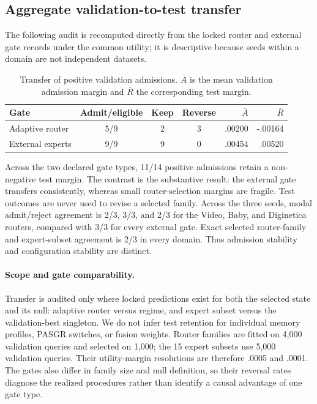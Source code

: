 \documentclass[runningheads]{llncs}
\begin{document}
\subsection{Aggregate validation-to-test transfer}
The following audit is recomputed directly from the locked router and external
gate records under the common utility; it is descriptive because seeds within
a domain are not independent datasets.
\begin{table}[H]
\caption{Transfer of positive validation admissions. $\bar A$ is the mean
validation admission margin and $\bar R$ the corresponding test margin.}
\centering\small
\begin{tabular}{lcccrr}
\toprule
Gate & Admit/eligible & Keep & Reverse & $\bar A$ & $\bar R$\\
\midrule
Adaptive router & 5/9 & 2 & 3 & .00200 & -.00164\\
External experts & 9/9 & 9 & 0 & .00454 & .00520\\
\bottomrule
\end{tabular}
\end{table}
Across the two declared gate types, 11/14 positive admissions retain a
non-negative test margin. The contrast is the substantive result: the
external gate transfers consistently, whereas small router-selection margins
are fragile. Test outcomes are never used to revise a selected family.
Across the three seeds, modal admit/reject agreement is 2/3, 3/3, and 2/3 for
the Video, Baby, and Diginetica routers, compared with 3/3 for every external
gate. Exact selected router-family and expert-subset agreement is 2/3 in every
domain. Thus admission stability and configuration stability are distinct.

\paragraph{Scope and gate comparability.}
Transfer is audited only where locked predictions exist for both the selected
state and its null: adaptive router versus regime, and expert subset versus
the validation-best singleton. We do not infer test retention for individual
memory profiles, PASGR switches, or fusion weights. Router families are fitted
on 4,000 validation queries and selected on 1,000; the 15 expert subsets use
5,000 validation queries. Their utility-margin resolutions are therefore
.0005 and .0001. The gates also differ in family size and null definition, so
their reversal rates diagnose the realized procedures rather than identify a
causal advantage of one gate type.
\end{document}
